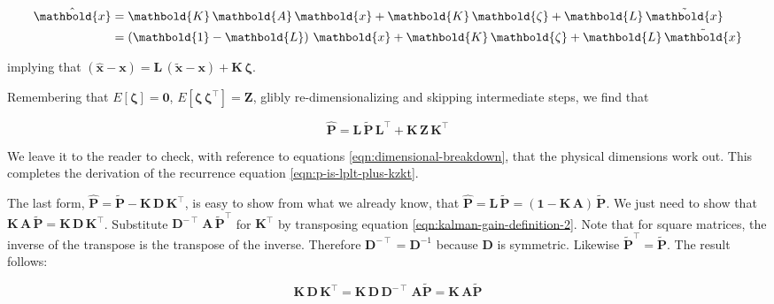 \documentclass[10pt,oneside,x11names]{article}
\begin{document}
\begin{align}
\notag
{\hat{\mathbold{x}}}
&=
\mathbold{K}\,
\mathbold{A}\,
\mathbold{x} +
\mathbold{K}\,
\mathbold{\zeta} +
\mathbold{L}\,
{\tilde{\mathbold{x}}}
\\
\notag
&=
\left(
\mathbold{1}-
\mathbold{L}
\right)\,
\mathbold{x} +
\mathbold{K}\,
\mathbold{\zeta} +
\mathbold{L}\,
{\tilde{\mathbold{x}}}
\end{align}

\noindent implying that
\(\left(
{\hat{\mathbold{x}}}-
\mathbold{x}
\right)=
\mathbold{L}\,
\left(
{\tilde{\mathbold{x}}}-
\mathbold{x}
\right) +
\mathbold{K}\,
\mathbold{\zeta}\).

Remembering that
\(E
\left[
\mathbold{\zeta}
\right]=\mathbold{0}\), 
\(E
\left[
\mathbold{\zeta}\,
\mathbold{\zeta}^\intercal
\right]=\mathbold{Z}\), glibly re-dimensionalizing and skipping
intermediate steps, we find that 

\begin{equation}
{\hat{\mathbold{P}}} = 
\mathbold{L}\,
{\tilde{\mathbold{P}}}\,
\mathbold{L}^\intercal + 
\mathbold{K}\,
\mathbold{Z}\,
\mathbold{K}^\intercal
\end{equation}

\noindent We leave it to the reader to check, with reference to equations
\ref{eqn:dimensional-breakdown}, that the physical dimensions work out. This
completes the derivation of the recurrence equation \ref{eqn:p-is-lplt-plus-kzkt}. 

The last form,
\(\hat{\mathbold{P}}
=
\tilde{\mathbold{P}}-
\mathbold{K}\,
\mathbold{D}\,
\mathbold{K}^\intercal\),
is easy to show from what we already know, that 
\(\hat{\mathbold{P}}
=
\mathbold{L}\,
\tilde{\mathbold{P}}
=
(\mathbold{1}-
\mathbold{K}\,
\mathbold{A})\,
\tilde{\mathbold{P}}\).
We just need to show that 
\(\mathbold{K}\,
\mathbold{A}\,
\tilde{\mathbold{P}} 
=
\mathbold{K}\,
\mathbold{D}\,
\mathbold{K}^\intercal\). 
Substitute 
\(\mathbold{D}^{-\intercal}\,
\mathbold{A}\,
\tilde{\mathbold{P}}^\intercal\)
for \(\mathbold{K}^\intercal\) by transposing
equation \ref{eqn:kalman-gain-definition-2}.
Note that for square matrices, the inverse of the
transpose is the transpose of the inverse. Therefore
\(\mathbold{D}^{-\intercal}
= \mathbold{D}^{-1}\) because \(\mathbold{D}\) is symmetric. Likewise 
\(\tilde{\mathbold{P}}^\intercal=\tilde{\mathbold{P}}\).  The result follows:

\begin{equation*}
\mathbold{K}\,
\mathbold{D}\,
\mathbold{K}^\intercal
=
\mathbold{K}\,
\mathbold{D}\,
\mathbold{D}^{-\intercal}\,
\mathbold{A}
\tilde{\mathbold{P}}
=
\mathbold{K}\,
\mathbold{A}
\tilde{\mathbold{P}}
\end{equation*}
\end{document}

